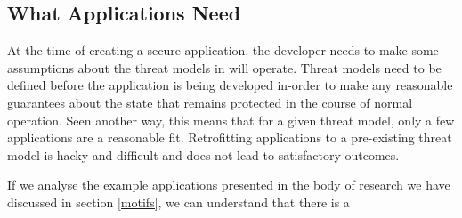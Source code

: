     
\subsection{What Applications Need}


At the time of creating a secure application, the developer needs to make some
assumptions about the threat models in will operate. Threat models need to be
defined before the application is being developed in-order to make any
reasonable guarantees about the state that remains protected in the course of
normal operation. Seen another way, this means that for a given threat model,
only a few applications are a reasonable fit. Retrofitting applications to a
pre-existing threat model is hacky and difficult and does not lead to
satisfactory outcomes.

If we analyse the example applications presented in the body of research we have
discussed in section \ref{motifs}, we can understand that there is a
